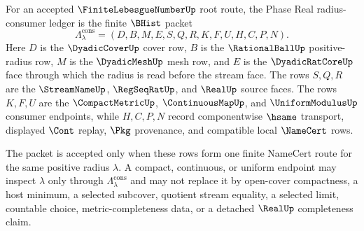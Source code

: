 \begin{definition}
\label{def:finite-lebesgue-number-phase-real-radius-consumer-ledger}
For an accepted $\FiniteLebesgueNumberUp$ root route, the Phase Real radius-consumer ledger is the finite $\BHist$ packet
$$
\Lambda_{\lambda}^{\mathrm{cons}}=(D,B,M,E,S,Q,R,K,F,U,H,C,P,N).
$$
Here $D$ is the $\DyadicCoverUp$ cover row, $B$ is the $\RationalBallUp$ positive-radius row, $M$ is the $\DyadicMeshUp$ mesh row, and $E$ is the $\DyadicRatCoreUp$ face through which the radius is read before the stream face. The rows $S,Q,R$ are the $\StreamNameUp$, $\RegSeqRatUp$, and $\RealUp$ source faces. The rows $K,F,U$ are the $\CompactMetricUp$, $\ContinuousMapUp$, and $\UniformModulusUp$ consumer endpoints, while $H,C,P,N$ record componentwise $\hsame$ transport, displayed $\Cont$ replay, $\Pkg$ provenance, and compatible local $\NameCert$ rows.

The packet is accepted only when these rows form one finite NameCert route for the same positive radius $\lambda$. A compact, continuous, or uniform endpoint may inspect $\lambda$ only through $\Lambda_{\lambda}^{\mathrm{cons}}$ and may not replace it by open-cover compactness, a host minimum, a selected subcover, quotient stream equality, a selected limit, countable choice, metric-completeness data, or a detached $\RealUp$ completeness claim.
\end{definition}

